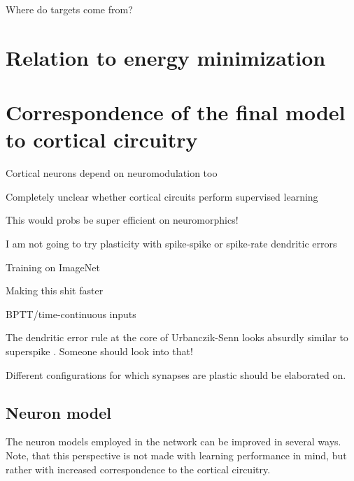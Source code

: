 Where do targets come from? \cite{Bengio2015}

\section{Relation to energy minimization}


\section{Correspondence of the final model to cortical circuitry}

Cortical neurons depend on neuromodulation too \cite{Roelfsema2018}

Completely unclear whether cortical circuits perform supervised learning \citep{magee2020synaptic}


This would probs be super efficient on neuromorphics!

I am not going to try plasticity with spike-spike or spike-rate dendritic errors

Training on ImageNet

Making this shit faster

BPTT/time-continuous inputs


The dendritic error rule at the core of Urbanczik-Senn looks absurdly similar to superspike \citep{Zenke2018}.
Someone should look into that!

Different configurations for which synapses are plastic should be elaborated on.


\subsection{Neuron model}


The neuron models employed in the network can be improved in several ways. Note, that this perspective is not made with
learning performance in mind, but rather with increased correspondence to the cortical circuitry. 



